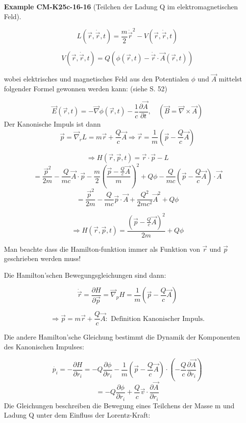 \documentclass[10pt, letterpaper]{article}
\newcommand{\CustomHeading}[3]{%
  \par\medskip\noindent%
  \textbf{#1 #2} \textnormal{(#3)}.\enskip%
}
\newenvironment{EXA}[2]{\CustomHeading{Example}{#1}{#2}}{}
\begin{document}
\begin{EXA}{CM-K25c-16-16}{Teilchen der Ladung Q im elektromagnetischen Feld}
\[L(\vec{r}, \dot{\vec{r}}, t) = \frac{m}{2}\dot{\vec{r}}^2 - V(\vec{r}, \dot{\vec{r}}, t)\]

\[V(\vec{r}, \dot{\vec{r}}, t) = Q(\phi(\vec{r},t) - \dot{\vec{r}}\cdot\vec{A}(\vec{r},t))\]

wobei elektrisches und magnetisches Feld aus den Potentialen $\phi$ und $\vec{A}$ mittelst folgender Formel gewonnen werden kann: (siehe S. 52)

\[\vec{E}(\vec{r},t) = -\vec{\nabla}\phi(\vec{r},t) - \frac{1}{c}\frac{\partial\vec{A}}{\partial t}, \quad (\vec{B} = \vec{\nabla}\times\vec{A})\]
Der Kanonische Impuls ist dann
\[\vec{p} = \vec{\nabla}_{\dot{r}} L = m\vec{r} + \frac{Q}{c}\vec{A} \Rightarrow \vec{r} = \frac{1}{m}\left(\vec{p} - \frac{Q}{c}\vec{A}\right)\]

\[\Rightarrow H(\vec{r},\vec{p},t) = \vec{r}\cdot\vec{p} - L\]
\[= \frac{\vec{p}^2}{2m} - \frac{Q}{mc}\vec{A}\cdot\vec{p} - \frac{m}{2}\left(\frac{\vec{p}-\frac{Q}{c}\vec{A}}{m}\right)^2 + Q\phi - \frac{Q}{mc}\left(\vec{p}-\frac{Q}{c}\vec{A}\right)\cdot\vec{A}\]
\[= \frac{\vec{p}^2}{2m} - \frac{Q}{mc}\vec{p}\cdot\vec{A} + \frac{Q^2}{2mc^2}\vec{A}^2 + Q\phi\]

\[\Rightarrow \boxed{H(\vec{r},\vec{p},t) = \frac{\left(\vec{p}-\frac{Q}{c}\vec{A}\right)^2}{2m} + Q\phi}\]

Man beachte dass die Hamilton-funktion immer als Funktion von $\vec{r}$ und $\vec{p}$ geschrieben werden muss!

Die Hamilton'schen Bewegungsgleichungen sind dann:

\[\dot{\vec{r}} = \frac{\partial H}{\partial \vec{p}} = \vec{\nabla}_p H = \frac{1}{m}\left(\vec{p} - \frac{Q}{c}\vec{A}\right)\]

\[\Rightarrow \vec{p} = m\vec{r} + \frac{Q}{c}\vec{A}: \text{ Definition Kanonischer Impuls.}\]

Die andere Hamilton'sche Gleichung bestimmt die Dynamik der Komponenten des Kanonischen Impulses:

\[\dot{p_i} = -\frac{\partial H}{\partial r_i} = -Q\frac{\partial \phi}{\partial r_i} - \frac{1}{m}\left(\vec{p}-\frac{Q}{c}\vec{A}\right)\cdot\left(-\frac{Q}{c}\frac{\partial \vec{A}}{\partial r_i}\right)\]
\[= -Q\frac{\partial \phi}{\partial r_i} + \frac{Q}{c}\vec{v}\cdot\frac{\partial \vec{A}}{\partial r_i}\]
Die Gleichungen beschreiben die Bewegung eines Teilchens der Masse m und Ladung Q unter dem Einfluss der Lorentz-Kraft:


\end{EXA}
\end{document}
